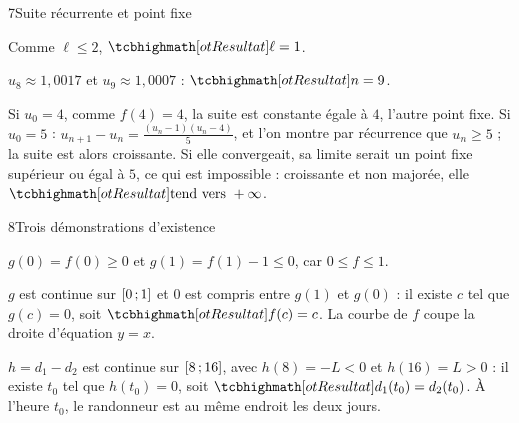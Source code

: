 \begin{corrige}{7}{Suite récurrente et point fixe}
\begin{questions}[start=5]
    Comme $\ell\leq2$, $\res{\ell=1}$.
  \item $u_8\approx1{,}0017$ et $u_9\approx1{,}0007$ : $\res{n=9}$.
  \item Si $u_0=4$, comme $f(4)=4$, la suite est constante égale à $4$, l'autre point fixe. Si $u_0=5$ :
    $u_{n+1}-u_n=\frac{(u_n-1)(u_n-4)}{5}$, et l'on montre par récurrence que $u_n\geq5$ ; la suite est alors croissante.
    Si elle convergeait, sa limite serait un point fixe supérieur ou égal à $5$, ce qui est impossible : croissante et non
    majorée, elle $\res{\text{tend vers }+\infty}$.
\end{questions}
\end{corrige}

\begin{corrige}{8}{Trois démonstrations d'existence}
\noindent
\begin{minipage}[t]{0.56\linewidth}\vspace{0pt}\raggedright
{}
\begin{questions}
  \item $g(0)=f(0)\geq0$ et $g(1)=f(1)-1\leq0$, car $0\leq f\leq1$.
  \item $g$ est continue sur $\mathopen{[}0\,{;}\,1\mathclose{]}$ et $0$ est compris entre $g(1)$ et $g(0)$ : il existe $c$ tel que $g(c)=0$, soit
    $\res{f(c)=c}$. La courbe de $f$ coupe la droite d'équation $y=x$.
\end{questions}
\begin{questions}[resume]
  \item $h=d_1-d_2$ est continue sur $\mathopen{[}8\,{;}\,16\mathclose{]}$, avec $h(8)=-L<0$ et $h(16)=L>0$ : il existe $t_0$ tel que $h(t_0)=0$, soit
    $\res{d_1(t_0)=d_2(t_0)}$. À l'heure $t_0$, le randonneur est au même endroit les deux jours.
\end{questions}
\end{minipage}\hfill
\begin{minipage}[t]{0.4\linewidth}\vspace{0pt}
\centering
{}
\end{minipage}
\end{corrige}
